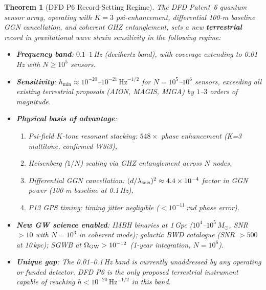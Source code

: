 \documentclass[11pt]{article}
\newtheorem{theorem}{Theorem}[section]
\theoremstyle{definition}
\theoremstyle{remark}
\newcommand{\Msun}{M_\odot}
\newcommand{\sqrtHz}{\,\mathrm{Hz}^{-1/2}}
\newcommand{\ee}[1]{\times10^{#1}}
\begin{document}
\begin{theorem}[DFD P6 Record-Setting Regime]
\label{thm:record}
The DFD Patent~6 quantum sensor array, operating with $K=3$ psi-enhancement,
differential 100-m baseline GGN cancellation, and coherent GHZ entanglement,
sets a new \textbf{terrestrial} record in gravitational wave strain sensitivity
in the following regime:

\begin{itemize}
\item \textbf{Frequency band}: $0.1$--$1$\,Hz (decihertz band),
  with coverage extending to 0.01\,Hz with $N \geq 10^5$ sensors.
\item \textbf{Sensitivity}: $h_{\min} \approx 10^{-20}$--$10^{-21}\sqrtHz$
  for $N = 10^5$--$10^6$ sensors, exceeding all existing terrestrial
  proposals (AION, MAGIS, MIGA) by $1$--$3$ orders of magnitude.
\item \textbf{Physical basis of advantage}:
  \begin{enumerate}
  \item Psi-field $K$-tone resonant stacking: $548\times$ phase enhancement
    (K=3 multitone, confirmed W3i3),
  \item Heisenberg ($1/N$) scaling via GHZ entanglement across $N$ nodes,
  \item Differential GGN cancellation: $(d/\lambda_{\rm seis})^2 \approx 4.4\ee{-4}$
    factor in GGN power (100-m baseline at 0.1\,Hz),
  \item P13 GPS timing: timing jitter negligible ($< 10^{-11}$\,rad phase error).
  \end{enumerate}
\item \textbf{New GW science enabled}: IMBH binaries at 1\,Gpc
  ($10^4$--$10^5\,\Msun$, SNR $> 10$ with $N=10^3$ in coherent mode);
  galactic BWD catalogue (SNR $> 500$ at 10\,kpc); SGWB at
  $\Omega_{\rm GW} > 10^{-12}$ (1-year integration, $N=10^6$).
\item \textbf{Unique gap}: The 0.01--0.1\,Hz band is currently unaddressed
  by any operating or funded detector.  DFD P6 is the \emph{only proposed
  terrestrial instrument} capable of reaching $h < 10^{-20}\sqrtHz$
  in this band.
\end{itemize}
\end{theorem}
\end{document}

